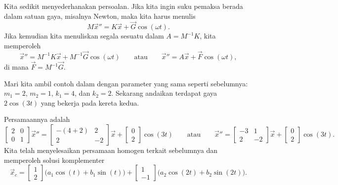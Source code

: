 Kita sedikit menyederhanakan persoalan.  Jika kita ingin
suku pemaksa berada dalam satuan gaya, misalnya Newton, maka kita harus menulis
\begin{equation*}
M \vec{x}'' = K \vec{x} + \vec{G} \cos(\omega t) .
\end{equation*}
Jika kemudian kita menuliskan segala sesuatu dalam $A = M^{-1} K$, kita memperoleh
\begin{equation*}
\vec{x}'' = M^{-1}K \vec{x} + M^{-1} \vec{G} \cos(\omega t) 
\qquad \text{atau} \qquad
\vec{x}'' = A \vec{x} + \vec{F} \cos(\omega t) ,
\end{equation*}
di mana $\vec{F} = M^{-1} \vec{G}$.

\begin{example}
Mari kita ambil contoh dalam  dengan
parameter yang sama seperti sebelumnya:
$m_1 = 2$, $m_2 = 1$, $k_1 = 4$, dan $k_2 = 2$.  Sekarang andaikan
terdapat gaya $2 \cos (3t)$ yang bekerja pada kereta kedua.

Persamaannya adalah
\begin{equation*}
\begin{bmatrix}
2 & 0 \\
0 & 1
\end{bmatrix}
{\vec{x}}'' =
\begin{bmatrix}
-(4+2) & 2 \\
2 & -2
\end{bmatrix}
\vec{x} 
+ 
\begin{bmatrix}
0 \\ 2
\end{bmatrix}
\cos (3 t)
\qquad
\text{atau}
\qquad
{\vec{x}}'' =
\begin{bmatrix}
-3 & 1 \\
2 & -2
\end{bmatrix}
\vec{x} 
+ 
\begin{bmatrix}
0 \\ 2
\end{bmatrix}
\cos (3 t) .
\end{equation*}
Kita telah menyelesaikan persamaan homogen terkait sebelumnya dan memperoleh
solusi komplementer
\begin{equation*}
\vec{x}_c =
\begin{bmatrix} 1 \\ 2 \end{bmatrix}
\bigl( a_1 \cos (t) + b_1 \sin (t) \bigr)
+
\begin{bmatrix} 1 \\ -1 \end{bmatrix}
\bigl( a_2 \cos (2t) + b_2 \sin (2t) \bigr) .
\end{equation*}


\end{example}
